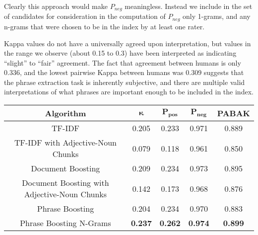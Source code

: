 Clearly this approach would make $P_{neg}$ meaningless. Instead we
include in the set of candidates for consideration in the computation
of $P_{neg}$ only 1-grams, and any n-grams that were chosen to be in
the index by at least one rater.

Kappa values do not have a universally agreed upon interpretation, but
values in the range we observe (about 0.15 to 0.3) have been
interpreted as indicating ``slight'' to ``fair'' agreement. The fact
that agreement between humans is only 0.336, and the lowest pairwise
Kappa between humans was 0.309 suggests that the phrase extraction
task is inherently subjective, and there are multiple valid
interpretations of what phrases are important enough to be included in
the index.



\begin{figure*}[!ht]
\caption{}
\label{fig:main_result}
\begin{tabular}{|c|c|c|c|c|}
\hline
\textbf{Algorithm} & $\mathbf{\kappa}$ & $\mathbf{P_{\text{pos}}}$ & $\mathbf{P_{\text{neg}}}$ & \textbf{PABAK} \\
\hline
TF-IDF & 0.205 & 0.233 & 0.971 & 0.889 \\
\hline
TF-IDF with Adjective-Noun Chunks & 0.079 & 0.118 & 0.961 & 0.850 \\
\hline
Document Boosting & 0.209 & 0.234 & 0.973 & 0.895 \\
\hline
Document Boosting with Adjective-Noun Chunks & 0.142 & 0.173 & 0.968 & 0.876 \\
\hline
Phrase Boosting & 0.204 & 0.234 & 0.970 & 0.883 \\
\hline
Phrase Boosting N-Grams & \textbf{0.237} & \textbf{0.262} & \textbf{0.974} & \textbf{0.899} \\
\hline
\end{tabular}
\end{figure*}

